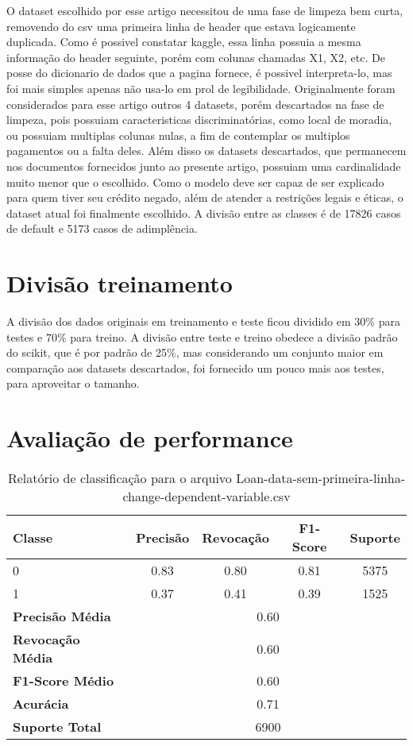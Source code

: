\documentclass[12pt]{article}
\begin{document}
O dataset escolhido por esse artigo\cite{dataset} necessitou de uma fase de limpeza bem curta, removendo do csv uma primeira linha de header que estava logicamente duplicada. Como é possivel constatar kaggle, essa linha possuia a mesma informação do header seguinte, porém com colunas chamadas X1, X2, etc. De posse do dicionario de dados que a pagina fornece, é possivel interpreta-lo, mas foi mais simples apenas não usa-lo em prol de legibilidade. Originalmente foram considerados para esse artigo outros 4 datasets, porém descartados na fase de limpeza, pois possuiam caracteristicas discriminatórias, como local de moradia, ou possuiam multiplas colunas nulas, a fim de contemplar os multiplos pagamentos ou a falta deles. Além disso os datasets descartados, que permanecem nos documentos fornecidos junto ao presente artigo, possuiam uma cardinalidade muito menor que o escolhido. Como o modelo deve ser capaz de ser explicado para quem tiver seu crédito negado, além de atender a restrições legais e éticas, o dataset atual foi finalmente escolhido. A divisão entre as classes é de 17826 casos de default e 5173 casos de adimplência.

\section{Divisão treinamento}

A divisão dos dados originais em treinamento e teste ficou dividido em 30\% para testes e 70\% para treino. A divisão entre teste e treino obedece a divisão padrão do scikit, que é por padrão de 25\%, mas considerando um conjunto maior em comparação aos datasets descartados, foi fornecido um pouco mais aos testes, para aproveitar o tamanho.

\section{Avaliação de performance}
\begin{table}[h]
	\centering
	\begin{tabular}{lcccc}
		\hline
		\textbf{Classe} & \textbf{Precisão} & \textbf{Revocação} & \textbf{F1-Score} & \textbf{Suporte} \\ \hline
		0                & 0.83              & 0.80               & 0.81               & 5375              \\
		1                & 0.37              & 0.41               & 0.39               & 1525              \\ \hline
		\textbf{Precisão Média} & \multicolumn{4}{c}{0.60} \\
		\textbf{Revocação Média} & \multicolumn{4}{c}{0.60} \\
		\textbf{F1-Score Médio} & \multicolumn{4}{c}{0.60} \\
		\textbf{Acurácia} & \multicolumn{4}{c}{0.71} \\
		\textbf{Suporte Total} & \multicolumn{4}{c}{6900} \\ \hline
	\end{tabular}
	\caption{Relatório de classificação para o arquivo Loan-data-sem-primeira-linha-change-dependent-variable.csv}
	\label{tab:class_report}
\end{table}
\end{document}
